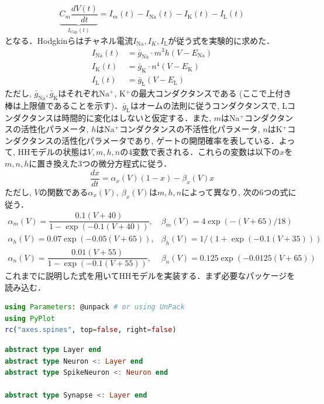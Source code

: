 \begin{equation}
\underbrace{C_m\frac {dV(t)}{dt}}_{I_\text{Cap} (t)}=I_{m}(t)-I_\text{Na}(t)-I_\text{K}(t)-I_\text{L}(t)
\end{equation}
となる．Hodgkinらはチャネル電流$I_\text{Na}, I_K, I_\text{L}$が従う式を実験的に求めた．
\begin{align}
I_\text{Na}(t) &= \bar{g}_{\text{Na}}\cdot m^{3}h(V-E_{\text{Na}})\\
I_\text{K}(t) &= \bar{g}_{\text{K}}\cdot n^{4}(V-E_{\text{K}})\\
I_\text{L}(t) &= \bar{g}_{\text{L}}(V-E_{\text{L}})
\end{align}
ただし, $\bar{g}_{\text{Na}}, \bar{g}_{\text{K}}$はそれぞれNa$^+$, K$^+$の最大コンダクタンスである (ここで上付き棒は上限値であることを示す)．$\bar{g}_{\text{L}}$はオームの法則に従うコンダクタンスで, Lコンダクタンスは時間的に変化はしないと仮定する．また, $m$はNa$^+$コンダクタンスの活性化パラメータ, $h$はNa$^+$コンダクタンスの不活性化パラメータ, $n$はK$^+$コンダクタンスの活性化パラメータであり, ゲートの開閉確率を表している．よって, HHモデルの状態は$V, m, h, n$の4変数で表される．これらの変数は以下の$x$を$m, n, h$に置き換えた3つの微分方程式に従う． 
\begin{equation}
\frac{dx}{dt}=\alpha_{x}(V)(1-x)-\beta_{x}(V)x
\end{equation}
ただし, $V$の関数である$\alpha_{x}(V),\ \beta_{x}(V)$は$m, h, n$によって異なり, 次の6つの式に従う．
\begin{equation}
\begin{array}{ll}
\alpha_{m}(V)=\dfrac {0.1(V+40)}{1-\exp (-0.1(V+40))}, &\beta_{m}(V)=4\exp {(-(V+65)/18)}\\
\alpha_{h}(V)=0.07\exp {(-0.05(V+65))}, & \beta_{h}(V)=1/(1+{\exp {\left(-0.1(V+35)\right)}})\\
\alpha_{n}(V)={\dfrac {0.01(V+55)}{1-\exp {\left(-0.1(V+55)\right)}}},& \beta_{n}(V)=0.125\exp {(-0.0125(V+65))} 
\end{array}
\end{equation}
これまでに説明した式を用いてHHモデルを実装する．まず必要なパッケージを読み込む．
\begin{lstlisting}[language=julia]
using Parameters: @unpack # or using UnPack
using PyPlot
rc("axes.spines", top=false, right=false)
\end{lstlisting}
\begin{lstlisting}[language=julia]
abstract type Layer end
abstract type Neuron <: Layer end
abstract type SpikeNeuron <: Neuron end

abstract type Synapse <: Layer end
\end{lstlisting}
